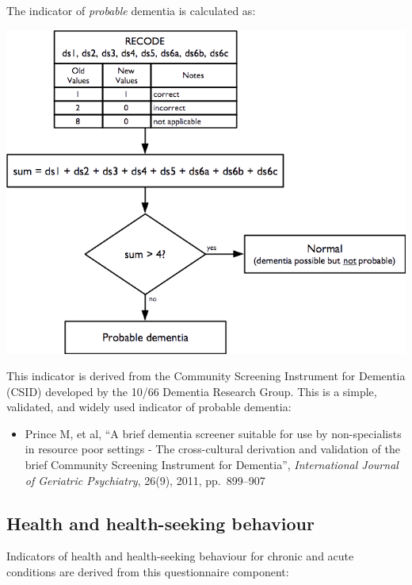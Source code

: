 \documentclass[12pt,a4paper]{book}
\providecommand{\tightlist}{%
  \setlength{\itemsep}{0pt}\setlength{\parskip}{0pt}}
\theoremstyle{definition}
\theoremstyle{definition}
\theoremstyle{definition}
\theoremstyle{remark}
\begin{document}
\newpage

The indicator of \emph{probable} dementia is calculated as:

\begin{center}\includegraphics{figures/indicators20} \end{center}

This indicator is derived from the Community Screening Instrument for
Dementia (CSID) developed by the 10/66 Dementia Research Group. This is
a simple, validated, and widely used indicator of probable dementia:

\begin{itemize}
\tightlist
\item
  Prince M, et al, ``A brief dementia screener suitable for use by
  non-specialists in resource poor settings - The cross-cultural
  derivation and validation of the brief Community Screening Instrument
  for Dementia'', \emph{International Journal of Geriatric Psychiatry},
  26(9), 2011, pp.~899--907
\end{itemize}

\newpage

\hypertarget{health-and-health-seeking-behaviour}{%
\subsection{Health and health-seeking
behaviour}\label{health-and-health-seeking-behaviour}}

Indicators of health and health-seeking behaviour for chronic and acute
conditions are derived from this questionnaire component:
\end{document}
